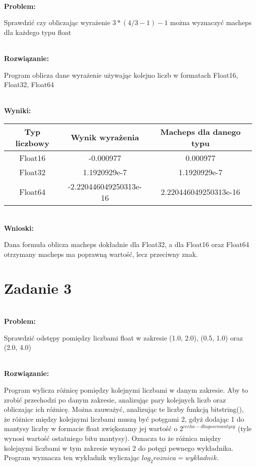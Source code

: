 \documentclass[a4paper,12pt]{article}
\begin{document}
\textbf{\\Problem:}

Sprawdzić czy obliczając wyrażenie \(3*(4/3-1)-1\) można wyznaczyć macheps dla każdego typu float 

\textbf{\\Rozwiązanie:}

Program oblicza dane wyrażenie używając kolejno liczb w formatach Float16, Float32, Float64

\textbf{\\Wyniki:}

\begin{center}
\begin{tabular}{ |c|c|c| }
\hline
Typ liczbowy & Wynik wyrażenia & Macheps dla danego typu \\
\hline
Float16 & \small{-0.000977} & \small{0.000977} \\
Float32 & \small{1.1920929e-7} & \small{1.1920929e-7} \\
Float64 & \small{-2.220446049250313e-16} & \small{2.220446049250313e-16} \\
\hline
\end{tabular}
\end{center}


\textbf{\\Wnioski:}

Dana formuła oblicza macheps dokładnie dla Float32, a dla Float16 oraz Float64 otrzymany macheps ma poprawną wartość, lecz przeciwny znak.


\section{Zadanie 3}

\textbf{\\Problem:}

Sprawdzić odstępy pomiędzy liczbami float w zakresie (1.0, 2.0), (0.5, 1.0) oraz (2.0, 4.0)

\textbf{\\Rozwiązanie:}

Program wylicza różnicę pomiędzy kolejnymi liczbami w danym zakresie. Aby to zrobić przechodzi po danym zakresie, analizując pary kolejnych liczb oraz obliczając ich różnicę. Można zauważyć, analizując te liczby funkcją bitstring(), że różnice między kolejnymi liczbami muszą być potęgami 2, gdyż dodając 1 do mantysy liczby w formacie float zwiększamy jej wartość o \(2^{cecha - długosc mantysy}\)  (tyle wynosi wartość ostatniego bitu mantysy). Oznacza to że różnica między kolejnymi liczbami w tym zakresie wynosi 2 do potęgi pewnego wykładnika. Program wyznacza ten wykładnik wyliczając \(log_2 roznica = wykładnik\).
\end{document}
